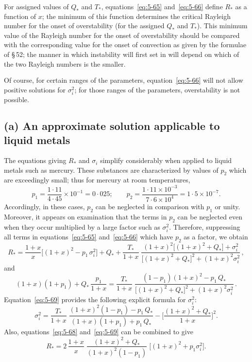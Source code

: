 For assigned values of $Q_*$ and $T_*$, equations~\eqref{eq:5-65} and~\eqref{eq:5-66} define $R_*$
as a function of $x$; the minimum of this function determines the critical
Rayleigh number for the onset of overstability (for the assigned $Q_*$ and
$T_*$). This minimum value of the Rayleigh number for the onset of over\-stability should be compared with the corresponding value for the onset
of convection as given by the formulae of \S\,52; the manner in which
instability will first set in will depend on which of the two Rayleigh
numbers is the smaller.

Of course, for certain ranges of the parameters, equation~\eqref{eq:5-66} will
not allow positive solutions for $\sigma_i^2$; for those ranges of the parameters,
overstability is not possible.

\subsection*{(a) An approximate solution applicable to liquid metals}

The equations giving $R_*$ and $\sigma_i$ simplify considerably when applied
to liquid metals such as mercury. These substances are characterized by
values of $p_2$ which are exceedingly small; thus for mercury at room
temperatures,
\begin{equation}
p_1 = \frac{1{\cdot}11}{4{\cdot}45}\times 10^{-1} = 0{\cdot}025;\qquad
p_2 = \frac{1{\cdot}11 \times 10^{-3}}{7{\cdot}6 \times 10^{4}} = 1{\cdot}5\times 10^{-7}.
\label{eq:5-67}
\end{equation}
Accordingly, in these cases, $p_2$ can be neglected in comparison with $p_1$
or unity. Moreover, it appears on examination that the terms in $p_2$ can
be neglected even when they occur multiplied by a large factor such as
$\sigma_i^2$. Therefore, suppressing all terms in equations~\eqref{eq:5-65}
and~\eqref{eq:5-66} which have $p_2$ as a factor, we obtain
\begin{equation}
R_* = \frac{1+x}{x}\bigl[(1{+}x)^2 - p_1\,\sigma_i^2\bigr]
+ Q_* + \frac{T_*}{1{+}x}\;\frac{(1{+}x)^2\bigl[(1{+}x)^2{+}Q_*\bigr]{+}\sigma_i^2}
{\bigl[(1{+}x)^2{+}Q_*\bigr]^2{+}(1{+}x)^2\sigma_i^2}\,,
\label{eq:5-68}
\end{equation}
and
\begin{equation}
(1{+}x)(1{+}p_1){+}Q_*\,\frac{p_1}{1{+}x} = \frac{T_*}{1{+}x}\;
\frac{(1{-}p_1)(1{+}x)^2 - p_1\,Q_*}
{\bigl[(1{+}x)^2{+}Q_*\bigr]^2{+}(1{+}x)^2\sigma_i^2}\,.
\label{eq:5-69}
\end{equation}
Equation~\eqref{eq:5-69} provides the following explicit formula for $\sigma_i^2$:
\begin{equation}
\sigma_i^2 = \frac{T_*}{1{+}x}\;
\frac{(1{+}x)^2(1{-}p_1) - p_1\,Q_*}{(1{+}x)(1{+}p_1)+p_1\,Q_*}
- \biggl[\frac{(1{+}x)^2{+}Q_*}{1{+}x}\biggr]^2.
\label{eq:5-70}
\end{equation}
Also, equations~\eqref{eq:5-68} and~\eqref{eq:5-69} can be combined to give
\begin{equation}
R_* = 2\,\frac{1+x}{x}\;\frac{(1{+}x)^2{+}Q_*}
{(1{+}x)^2(1{-}p_1)}\;\bigl[(1{+}x)^2{+}p_1\sigma_i^2\bigr].
\label{eq:5-71}
\end{equation}

